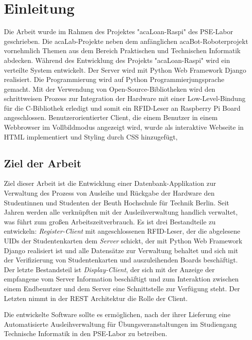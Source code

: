 \chapter{Einleitung}
\label{sec:intro}
Die Arbeit wurde im Rahmen des Projektes "acaLoan-Raspi"\cite{website:17} des PSE-Labor geschrieben. Die acaLab-Projekte neben dem anfänglichen acaBot-Roboterprojekt vornehmlich Themen aus dem Bereich Praktischen und Technischen Informatik abdecken\cite{website:1}. Während des Entwicklung des Projekts  "acaLoan-Raspi" wird ein verteilte System entwickelt. Der Server wird mit Python Web Framework Django realisiert. Die Programmierung wird auf Python Programmierjungsprache gemacht. Mit der Verwendung von Open-Source-Bibliotheken wird den schrittweisen Prozess zur Integration der Hardware mit einer Low-Level-Bindung für die C-Bibliothek erledigt und somit ein RFID-Leser an Raspberry Pi Board angeschlossen. Benutzerorientierter Client, die einem Benutzer in einem Webbrowser im Vollbildmodus angezeigt wird, wurde als interaktive Webseite in HTML implementiert und Styling durch CSS hinzugefügt, 


\section{Ziel der Arbeit}
\label{sec:intro:goal}
Ziel dieser Arbeit ist die Entwicklung einer Datenbank-Applikation zur Verwaltung des Prozess von Ausleihe und Rückgabe der Hardware den Studentinnen und Studenten der Beuth Hochschule für Technik Berlin. Seit Jahren werden alle verknüpften mit der Ausleihverwaltung handlich verwaltet, was führt zum großen Arbeitszeitverbrauch. Es ist drei Bestandteile zu entwickeln: \textit{Register-Client} mit angeschlossenen RFID-Leser, der die abgelesene UIDs der Studentenkarten dem \textit{Server} schickt, der mit Python Web Framework Django realisiert ist und alle Datensätze zur Verwaltung behaltet und sich mit der Verifizierung von Studentenkarten und auszuleihenden Boards beschäftigt. Der letzte Bestandsteil ist \textit{Display-Client}, der sich mit der Anzeige der empfangene vom Server Information beschäftigt und zum Interaktion zwischen einem Endbenutzer und dem Server eine Schnittstelle zur Verfügung steht. Der Letzten nimmt in der REST Architektur die Rolle der Client. 

Die entwickelte Software sollte es ermöglichen, nach der ihrer Lieferung eine Automatisierte Ausleihverwaltung für Übungsveranstaltungen im Studiengang Technische Informatik in den PSE-Labor zu betreiben. 

